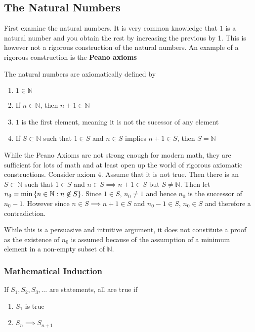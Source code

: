 \documentclass[../notes.tex]{subfiles}
\begin{document}

\subsection{The Natural Numbers}
First examine the natural numbers. It is very common knowledge that $1$ is a natural number and you obtain the rest by increasing the previous by 1. This is however not a rigorous construction of the natural numbers. An example of a rigorous construction is the \textbf{Peano axioms}

\begin{definition}
    The natural numbers are axiomatically defined by
    \begin{enumerate}
        \item $1 \in \mathbb{N}$
        \item If $n \in \mathbb{N}$, then $n + 1 \in \mathbb{N}$
        \item $1$ is the first element, meaning it is not the sucessor of any element
        \item If $S \subset \mathbb{N}$ such that $1 \in S$ and $n \in S$ implies $n + 1 \in S$, then $S = \mathbb{N}$
    \end{enumerate}
\end{definition}

While the Peano Axioms are not strong enough for modern math, they are sufficient for lots of math and at least open up the world of rigorous axiomatic constructions. Consider axiom $4$. Assume that it is not true. Then there is an $S \subset \mathbb{N}$ such that $1 \in S$ and $n \in S \implies n + 1 \in S$ but $S \neq \mathbb{N}$. Then let $n_0 = \min\qty{n \in \mathbb{N} : n \not\in S}$. Since $1 \in S$, $n_0 \neq 1$ and hence $n_0$ is the successor of $n_0 - 1$. However since $n \in S \implies n+1 \in S$ and $n_0 - 1 \in S$, $n_0 \in S$ and therefore a contradiction.

While this is a persuasive and intuitive argument, it does not constitute a proof as the existence of $n_0$ is assumed because of the assumption of a minimum element in a non-empty subset of $\mathbb{N}$.

\subsubsection{Mathematical Induction}
\begin{theorem}[Induction]
    If $S_1, S_2, S_3, \ldots$ are statements, all are true if
    \begin{enumerate}
        \item $S_1$ is true
        \item $S_n \implies S_{n+1}$
    \end{enumerate}
\end{theorem}
\end{document}
